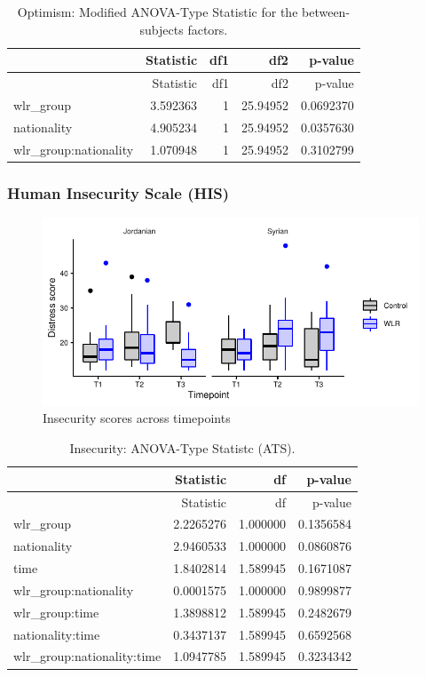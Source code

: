 \documentclass[]{article}
\begin{document}
\begin{longtable}[]{@{}lrrrr@{}}
\caption{Optimism: Modified ANOVA-Type Statistic for the
between-subjects factors.}\tabularnewline
\toprule
& Statistic & df1 & df2 & p-value\tabularnewline
\midrule
\endfirsthead
\toprule
& Statistic & df1 & df2 & p-value\tabularnewline
\midrule
\endhead
wlr\_group & 3.592363 & 1 & 25.94952 & 0.0692370\tabularnewline
nationality & 4.905234 & 1 & 25.94952 & 0.0357630\tabularnewline
wlr\_group:nationality & 1.070948 & 1 & 25.94952 &
0.3102799\tabularnewline
\bottomrule
\end{longtable}

\newpage

\hypertarget{human-insecurity-scale-his}{%
\subsubsection{Human Insecurity Scale
(HIS)}\label{human-insecurity-scale-his}}

\begin{figure}[H]

{\centering \includegraphics{WLR-analyses-report_files/figure-latex/unnamed-chunk-22-1} 

}

\caption{Insecurity scores across timepoints}\label{fig:unnamed-chunk-22}
\end{figure}

\begin{longtable}[]{@{}lrrr@{}}
\caption{Insecurity: ANOVA-Type Statistc (ATS).}\tabularnewline
\toprule
& Statistic & df & p-value\tabularnewline
\midrule
\endfirsthead
\toprule
& Statistic & df & p-value\tabularnewline
\midrule
\endhead
wlr\_group & 2.2265276 & 1.000000 & 0.1356584\tabularnewline
nationality & 2.9460533 & 1.000000 & 0.0860876\tabularnewline
time & 1.8402814 & 1.589945 & 0.1671087\tabularnewline
wlr\_group:nationality & 0.0001575 & 1.000000 & 0.9899877\tabularnewline
wlr\_group:time & 1.3898812 & 1.589945 & 0.2482679\tabularnewline
nationality:time & 0.3437137 & 1.589945 & 0.6592568\tabularnewline
wlr\_group:nationality:time & 1.0947785 & 1.589945 &
0.3234342\tabularnewline
\bottomrule
\end{longtable}
\end{document}
